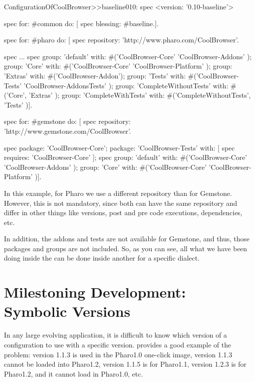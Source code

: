 \documentclass[a4paper,10pt,twoside]{book}
\begin{document}
  \begin{code}{}
 ConfigurationOfCoolBrowser>>baseline010: spec
       <version: '0.10-baseline'>

       spec for: #common do: [
              spec blessing: #baseline.].

       spec for: #pharo do: [
              spec repository: 'http://www.pharo.com/CoolBrowser'.

              spec
                     ...
              spec
                     group: 'default' with: #('CoolBrowser-Core' 'CoolBrowser-Addons' );
                     group: 'Core' with: #('CoolBrowser-Core' 'CoolBrowser-Platform' );
                     group: 'Extras' with: #('CoolBrowser-Addon');
                     group: 'Tests' with: #('CoolBrowser-Tests' 'CoolBrowser-AddonsTests' );
                     group: 'CompleteWithoutTests' with: #('Core', 'Extras' );
                     group: 'CompleteWithTests' with: #('CompleteWithoutTests', 'Tests' )].

       spec for: #gemstone do: [
              spec repository: 'http://www.gemstone.com/CoolBrowser'.

              spec
                     package: 'CoolBrowser-Core';
                     package: 'CoolBrowser-Tests' with: [ spec requires: 'CoolBrowser-Core' ];
              spec
                     group: 'default' with: #('CoolBrowser-Core' 'CoolBrowser-Addons' );
                     group: 'Core' with: #('CoolBrowser-Core' 'CoolBrowser-Platform' )].

\end{code}

In this example, for Pharo we use a different repository than for Gemstone. However, this is not mandatory, since both can have the same repository and differ in other things like versions, post and pre code executions, dependencies, etc.

In addition, the addons and tests are not available for Gemstone, and thus, those packages and groups are not included. So, as you can see, all what we have been doing inside the  can be done inside another  for a specific dialect.


\section{Milestoning Development: Symbolic Versions}
In any large evolving application, it is difficult to know which version of a configuration to use with a specific version.
 provides a good example of the problem: version 1.1.3 is used in the Pharo1.0 one-click image,  version 1.1.3 cannot be loaded into Pharo1.2, version 1.1.5 is for Pharo1.1, version 1.2.3 is for Pharo1.2, and it cannot load in Pharo1.0, etc.
\end{document}

